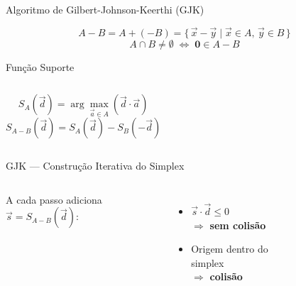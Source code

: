 \documentclass[12pt]{beamer}
\begin{document}
\begin{frame}{Algoritmo de Gilbert-Johnson-Keerthi (GJK)}
  \begin{figure}
    \centering
    
  \end{figure}

  \[
    A - B = A + (-B) = \{\,\vec{x}{-}\vec{y} \mid \vec{x}{\in}A,\,\vec{y}{\in}B\,\}
  \]
  \vspace{0.3cm}
  \[
    A \cap B \neq \emptyset \;\iff\; \mathbf{0} \in A{-}B
  \]
\end{frame}

\begin{frame}{Função Suporte}
  \begin{columns}
      \[
        S_A(\vec d) = \arg\max_{\vec a \in A} (\vec d \cdot \vec a)
      \]
      \[
        S_{A-B}(\vec{d}) = S_A(\vec{d}) - S_B(-\vec{d})
      \]
      \begin{figure}
        \centering
        
      \end{figure}
  \end{columns}
\end{frame}

\begin{frame}{GJK — Construção Iterativa do Simplex}
  \begin{columns}[c]
      A cada passo adiciona $\vec{s} = S_{A-B}(\vec{d})$:
      \vspace{0.3cm}
      \begin{itemize}
        \item $\vec{s}\cdot\vec{d} \leq 0$\\
              $\Rightarrow$ \textbf{sem colisão}
        \item Origem dentro do simplex\\
              $\Rightarrow$ \textbf{colisão}
      \end{itemize}
      \begin{figure}
        \centering
        
      \end{figure}
  \end{columns}
\end{frame}
\end{document}
